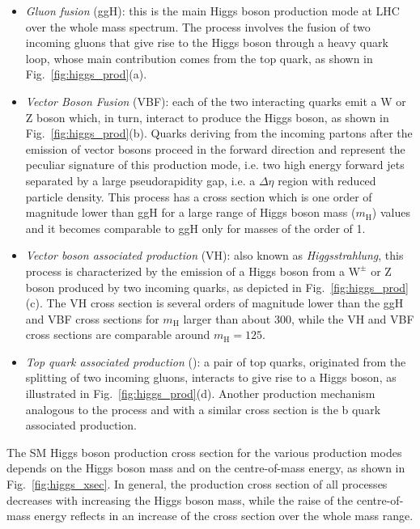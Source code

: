 \begin{itemize}
\item \emph{Gluon fusion} (ggH): this is the main Higgs boson production mode at LHC over the whole mass spectrum. The process involves the fusion of two incoming gluons that give rise to the Higgs boson through a heavy quark loop, whose main contribution comes from the top quark, as shown in Fig.~\ref{fig:higgs_prod}(a).

\item \emph{Vector Boson Fusion} (VBF): each of the two interacting quarks emit a W or Z boson which, in turn, interact to produce the Higgs boson, as shown in Fig.~\ref{fig:higgs_prod}(b). Quarks deriving from the incoming partons after the emission of vector bosons proceed in the forward direction and represent the peculiar signature of this production mode, i.e. two high energy forward jets separated by a large pseudorapidity gap, i.e. a $\Delta\eta$ region with reduced particle density. This process has a cross section which is one order of magnitude lower than ggH for a large range of Higgs boson mass ($m_\mathrm{H}$) values and it becomes comparable to ggH only for masses of the order of 1\TeV.

\item \emph{Vector boson associated production} (VH): also known as \emph{Higgsstrahlung}, this process is characterized by the emission of a Higgs boson from a $\mathrm{W}^\pm$ or Z boson produced by two incoming quarks, as depicted in Fig.~\ref{fig:higgs_prod}(c). The VH cross section is several orders of magnitude lower than the ggH and VBF cross sections for $m_\mathrm{H}$ larger than about 300\GeV, while the VH and VBF cross sections are comparable around $m_\mathrm{H} = 125$\GeV.

\item \emph{Top quark associated production} (\ttH): a pair of top quarks, originated from the splitting of two incoming gluons, interacts to give rise to a Higgs boson, as illustrated in Fig.~\ref{fig:higgs_prod}(d). Another production mechanism analogous to the \ttH process and with a similar cross section is the b quark associated production.
\end{itemize}

The SM Higgs boson production cross section for the various production modes depends on the Higgs boson mass and on the centre-of-mass energy, as shown in Fig.~\ref{fig:higgs_xsec}. In general, the production cross section of all processes decreases with increasing the Higgs boson mass, while the raise of the centre-of-mass energy reflects in an increase of the cross section over the whole mass range.

